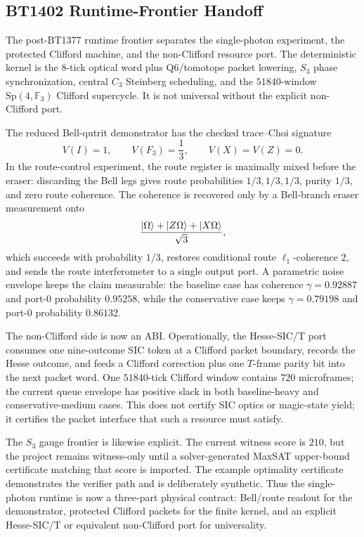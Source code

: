 ﻿\documentclass[12pt]{article}
\newcommand{\FF}{\mathbb{F}}
\newcommand{\Sp}{\mathrm{Sp}}
\begin{document}
\subsection{BT1402 Runtime-Frontier Handoff}

The post-BT1377 runtime frontier separates the single-photon experiment, the
protected Clifford machine, and the non-Clifford resource port.  The deterministic
kernel is the \(8\)-tick optical word plus Q6/tomotope packet lowering, \(S_3\)
phase synchronization, central \(C_3\) Steinberg scheduling, and the
\(51840\)-window \(\Sp(4,\FF_3)\) Clifford supercycle.  It is not universal
without the explicit non-Clifford port.

The reduced Bell-qutrit demonstrator has the checked trace--Choi signature
\[
V(I)=1,\qquad V(F_3)=\frac13,\qquad V(X)=V(Z)=0.
\]
In the route-control experiment, the route register is maximally mixed before the
eraser: discarding the Bell legs gives route probabilities \(1/3,1/3,1/3\),
purity \(1/3\), and zero route coherence.  The coherence is recovered only by a
Bell-branch eraser measurement onto
\[
\frac{\ket{\Omega}+\ket{Z\Omega}+\ket{X\Omega}}{\sqrt3},
\]
which succeeds with probability \(1/3\), restores conditional route
\(\ell_1\)-coherence \(2\), and sends the route interferometer to a single
output port.  A parametric noise envelope keeps the claim measurable: the
baseline case has coherence \(\gamma=0.92887\) and port-\(0\) probability
\(0.95258\), while the conservative case keeps \(\gamma=0.79198\) and
port-\(0\) probability \(0.86132\).

The non-Clifford side is now an ABI.  Operationally, the Hesse-SIC/T port consumes one
nine-outcome SIC token at a Clifford packet boundary, records the Hesse outcome,
and feeds a Clifford correction plus one \(T\)-frame parity bit into the next
packet word.  One \(51840\)-tick Clifford window contains \(720\) microframes;
the current queue envelope has positive slack in both baseline-heavy and
conservative-medium cases.  This does not certify SIC optics or magic-state
yield; it certifies the packet interface that such a resource must satisfy.

The \(S_3\) gauge frontier is likewise explicit.  The current witness score is
\(210\), but the project remains witness-only until a solver-generated MaxSAT
upper-bound certificate matching that score is imported.  The example
optimality certificate demonstrates the verifier path and is deliberately
synthetic.  Thus the single-photon runtime is now a three-part physical
contract: Bell/route readout for the demonstrator, protected Clifford packets
for the finite kernel, and an explicit Hesse-SIC/T or equivalent non-Clifford
port for universality.
\end{document}
